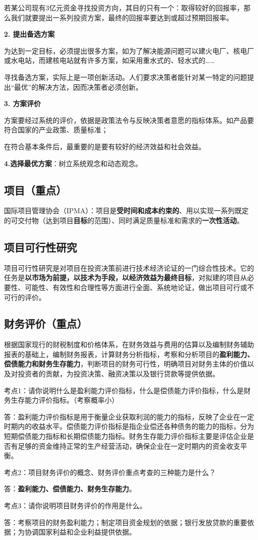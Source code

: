 若某公司现有3亿元资金寻找投资方向，其目的只有一个：取得较好的回报率，那么我们就要提出一系列投资方案，最终的回报率要达到或超过预期回报率。

\textbf{2. 提出备选方案}

为达到一定目标，必须提出很多方案，如为了解决能源问题可以建火电厂、核电厂或水电站，而建核电站就有许多方案，如采用重水式的、轻水式的……

寻找备选方案，实际上是一项创新活动。人们要求决策者能针对某一特定的问题提出“最优”的解决方法，因而决策者必须创新。

\textbf{3. 方案评价}

方案要经过系统的评价，依据是政策法令与反映决策者意愿的指标体系。如产品要符合国家的产业政策、质量标准；

在符合基本条件后，最重要的是要有较好的经济效益和社会效益。

\textbf{4.选择最优方案}：树立系统观念和动态观念。


\subsection{项目（重点）}
国际项目管理协会（IPMA）：项目是\textbf{受时间和成本约束的}、用以实现一系列既定的可交付物（达到项目\textbf{目标}的范围）、同时满足质量标准和需求的\textbf{一次性活动}。

\subsection{项目可行性研究}
项目可行性研究是对项目在投资决策前进行技术经济论证的一门综合性技术。它的任务是\textbf{以市场为前提，以技术为手段，以经济效益为最终目标}，对拟建的项目从必要性、可能性、有效性和合理性等方面进行全面、系统地论证，做出项目可行或不可行的评价。

\subsection{财务评价（重点）}
根据国家现行的财税制度和价格体系，在财务效益与费用的估算以及编制财务辅助报表的基础上，编制财务报表，计算财务分析指标，考察和分析项目的\textbf{盈利能力、偿债能力和财务生存能力}，判断项目的财务可行性，明确项目对财务主体的价值以及对投资者的贡献，为投资决策、融资决策以及银行贷款等提供依据。

考点1：请你说明什么是盈利能力评价指标，什么是偿债能力评价指标，什么是财务生存能力评价指标。（考察概率小）

答：盈利能力评价指标是用于衡量企业获取利润的能力的指标，反映了企业在一定时期内的收益水平。偿债能力评价指标是指企业偿还各种债务的能力的指标，分为短期偿债能力指标和长期偿债能力指标。财务生存能力评价指标主要是评估企业是否有足够的资金维持正常的生产经营活动，确保企业在一定时期内的资金收支平衡。

考点2：项目财务评价的概念、财务评价重点考查的三种能力是什么？

答：\textbf{盈利能力、偿债能力、财务生存能力}。

考点3：请你说明项目财务评价的作用是什么。

答：考察项目的财务盈利能力；制定项目资金规划的依据；银行发放贷款的重要依据；为协调国家利益和企业利益提供依据。